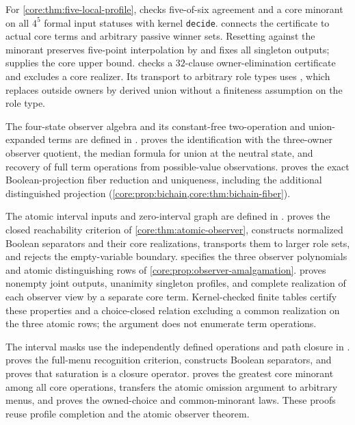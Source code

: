 For \cref{core:thm:five-local-profile},
 checks five-of-six agreement
and a core minorant on all $4^5$ formal input statuses with kernel
\texttt{decide}.  connects
the certificate to actual core terms and arbitrary passive winner sets.
Resetting against the minorant preserves five-point interpolation by
 and fixes all singleton
outputs;  supplies the core upper bound.
 checks a $32$-clause owner-elimination
certificate and excludes a core realizer. Its transport to arbitrary role
types uses , which replaces outside
owners by derived union without a finiteness assumption on the role type.

The four-state observer algebra and its constant-free two-operation and
union-expanded terms are defined in .
 proves the identification with the
three-owner observer quotient, the median formula for union at the neutral
state, and recovery of full term operations from possible-value observations.
 proves the exact Boolean-projection
fiber reduction and uniqueness, including the additional distinguished
projection (\cref{core:prop:bichain,core:thm:bichain-fiber}).

The atomic interval inputs and zero-interval graph are defined in
.
 proves the closed reachability
criterion of \cref{core:thm:atomic-observer}, constructs normalized Boolean
separators and their core realizations, transports them to larger role sets,
and rejects the empty-variable boundary.
 specifies the three observer
polynomials and atomic distinguishing rows of
\cref{core:prop:observer-amalgamation}.
 proves nonempty joint outputs,
unanimity singleton profiles, and complete realization of each observer view
by a separate core term. Kernel-checked finite tables certify these properties
and a choice-closed relation excluding a common realization on the three
atomic rows; the argument does not enumerate term operations.

The interval masks use the independently defined operations and path closure
in .
 proves the full-menu recognition
criterion, constructs Boolean separators, and proves that saturation is a
closure operator.  proves the greatest
core minorant among all core operations, transfers the atomic omission
argument to arbitrary menus, and proves the owned-choice and common-minorant
laws. These proofs reuse profile completion and the atomic observer theorem.

